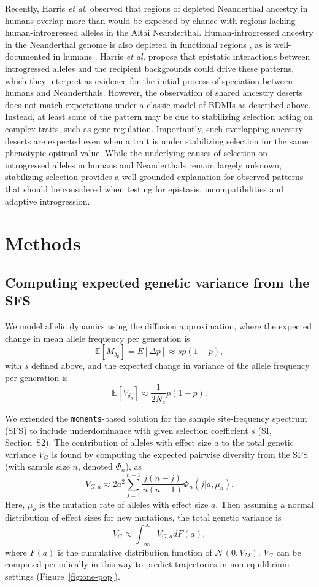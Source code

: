 \documentclass[10pt,letterpaper]{article}
\newcommand{\E}{\mathbb{E}}
\newcommand{\moments}{\texttt{moments}\xspace}
\begin{document}
Recently, Harris \emph{et al.} \cite{harris2023diverse} observed that regions
of depleted Neanderthal ancestry in humans overlap more than would be expected
by chance with regions lacking human-introgressed alleles in the Altai
Neanderthal.  Human-introgressed ancestry in the Neanderthal genome is also
depleted in functional regions \cite{harris2023diverse}, as is well-documented
in humans \cite{sankararaman2014genomic, sankararaman2016combined}.  Harris
\emph{et al.} \cite{harris2023diverse} propose that epistatic interactions
between introgressed alleles and the recipient backgrounds could drive these
patterns, which they interpret as evidence for the initial process of
speciation between humans and Neanderthals. However, the observation of shared
ancestry deserts does not match expectations under a classic model of BDMIs as
described above.  Instead, at least some of the pattern may be due to
stabilizing selection acting on complex traits, such as gene regulation.
Importantly, such overlapping ancestry deserts are expected even when a trait
is under stabilizing selection for the same phenotypic optimal value. While the
underlying causes of selection on introgressed alleles in humans and
Neanderthals remain largely unknown, stabilizing selection provides a
well-grounded explanation for observed patterns that should be considered when
testing for epistasis, incompatibilities and adaptive introgression.

\section*{Methods}

\subsection*{Computing expected genetic variance from the SFS}

We model allelic dynamics using the diffusion approximation, where the expected
change in mean allele frequency per generation is
\[\E[M_{\delta_p}] = E[\Delta p] \approx s p(1-p),\]
with $s$ defined above, and the expected change in variance of the allele frequency per
generation is
\[\E[V_{\delta_p}] \approx \frac{1}{2N_e}p(1-p).\]


We extended the \moments-based solution for the sample site-frequency spectrum
(SFS) \cite{jouganous2017inferring} to include underdominance with given
selection coefficient $s$ (SI, Section~S2). The
contribution of alleles with effect size $a$ to the total genetic variance
$V_G$ is found by computing the expected pairwise diversity from the SFS (with
sample size $n$, denoted $\Phi_n$), as
\[V_{G,a} \approx 2a^2\sum_{j=1}^{n-1} \frac{j(n-j)}{n(n-1)} \Phi_n(j|a,\mu_a).\]
Here, $\mu_a$ is the mutation rate of alleles with effect size $a$. Then
assuming a normal distribution of effect sizes for new mutations, the total
genetic variance is
\[V_G \approx \int_{-\infty}^\infty V_{G,a} dF(a),\]
where \(F(a)\) is the cumulative distribution function of \(\mathcal{N}(0,V_M)\).
$V_G$ can be computed periodically in this way to predict trajectories in
non-equilibrium settings (Figure~\ref{fig:one-pop}).
\end{document}
